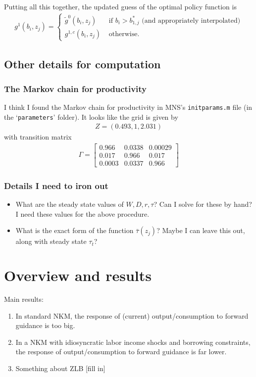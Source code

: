 \documentclass[12pt]{article}
\begin{document}
Putting all this together, the updated guess of the optimal policy function is
\begin{align*}
g^1(b_i,z_j) = 
\begin{cases}
\tilde g^0(b_i,z_j) &\text{ if } b_i > b^*_{1,j} \text{ (and appropriately interpolated)}\\
g^{1,c}(b_i,z_j)&\text{ otherwise.}
\end{cases}
\end{align*}

\subsection{Other details for computation}
\subsubsection{The Markov chain for productivity}
I think I found the Markov chain for productivity in MNS's \verb|initparams.m| file (in the `\verb|parameters|' folder). It looks like the grid is given by
\begin{align*}
Z = (0.493, 1, 2.031)
\end{align*}
with transition matrix
\begin{align*}
\Gamma = 
\begin{bmatrix}
0.966 &	0.0338 &	0.00029 \\
0.017&	0.966& 	0.017 \\
0.0003 &	0.0337 &	0.966
\end{bmatrix}
\end{align*}

\subsubsection{Details I need to iron out}
\begin{itemize}
\item What are the steady state values of $W, D, r, \tau$? Can I solve for these by hand? I need these values for the above procedure.
\item What is the exact form of the function $\bar \tau(z_j)$? Maybe I can leave this out, along with steady state $\tau_t$?
\end{itemize}




\newpage

\section{Overview and results}
Main results:
\begin{enumerate}
\item In standard NKM, the response of (current) output/consumption to forward guidance is too big.
\item In a NKM with idiosyncratic labor income shocks and borrowing constraints, the response of output/consumption to forward guidance is far lower.
\item Something about ZLB [fill in]
\end{enumerate}
\end{document}
